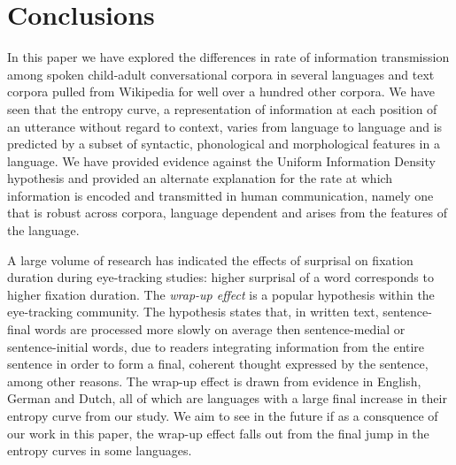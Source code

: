 \documentclass[10pt, letterpaper]{article}
\begin{document}
\section{Conclusions}\label{conclusions}

In this paper we have explored the differences in rate of information
transmission among spoken child-adult conversational corpora in several
languages and text corpora pulled from Wikipedia for well over a hundred
other corpora. We have seen that the entropy curve, a representation of
information at each position of an utterance without regard to context,
varies from language to language and is predicted by a subset of
syntactic, phonological and morphological features in a language. We
have provided evidence against the Uniform Information Density
hypothesis and provided an alternate explanation for the rate at which
information is encoded and transmitted in human communication, namely
one that is robust across corpora, language dependent and arises from
the features of the language.

A large volume of research has indicated the effects of surprisal on
fixation duration during eye-tracking studies: higher surprisal of a
word corresponds to higher fixation duration. The \emph{wrap-up effect}
is a popular hypothesis within the eye-tracking community. The
hypothesis states that, in written text, sentence-final words are
processed more slowly on average then sentence-medial or
sentence-initial words, due to readers integrating information from the
entire sentence in order to form a final, coherent thought expressed by
the sentence, among other reasons. The wrap-up effect is drawn from
evidence in English, German and Dutch, all of which are languages with a
large final increase in their entropy curve from our study. We aim to
see in the future if as a consquence of our work in this paper, the
wrap-up effect falls out from the final jump in the entropy curves in
some languages.

\setlength{\parindent}{-0.1in} \setlength{\leftskip}{0.125in} \noindent


\end{document}
